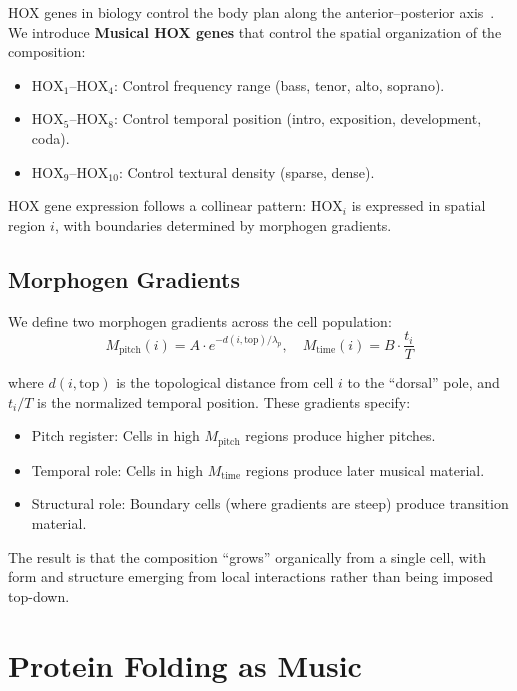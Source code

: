 \documentclass[11pt,a4paper]{article}
\begin{document}
HOX genes in biology control the body plan along the anterior--posterior axis~\citep{carroll1995}. We introduce \textbf{Musical HOX genes} that control the spatial organization of the composition:

\begin{itemize}
  \item $\text{HOX}_1$--$\text{HOX}_4$: Control frequency range (bass, tenor, alto, soprano).
  \item $\text{HOX}_5$--$\text{HOX}_8$: Control temporal position (intro, exposition, development, coda).
  \item $\text{HOX}_9$--$\text{HOX}_{10}$: Control textural density (sparse, dense).
\end{itemize}

HOX gene expression follows a collinear pattern: $\text{HOX}_i$ is expressed in spatial region $i$, with boundaries determined by morphogen gradients.

\subsection{Morphogen Gradients}

We define two morphogen gradients across the cell population:
\begin{equation}
  M_{\text{pitch}}(i) = A \cdot e^{-d(i, \text{top})/\lambda_p}, \quad M_{\text{time}}(i) = B \cdot \frac{t_i}{T}
\end{equation}

where $d(i, \text{top})$ is the topological distance from cell $i$ to the ``dorsal'' pole, and $t_i / T$ is the normalized temporal position. These gradients specify:
\begin{itemize}
  \item Pitch register: Cells in high $M_{\text{pitch}}$ regions produce higher pitches.
  \item Temporal role: Cells in high $M_{\text{time}}$ regions produce later musical material.
  \item Structural role: Boundary cells (where gradients are steep) produce transition material.
\end{itemize}

The result is that the composition ``grows'' organically from a single cell, with form and structure emerging from local interactions rather than being imposed top-down.

\section{Protein Folding as Music}\label{sec:folding}
\end{document}
